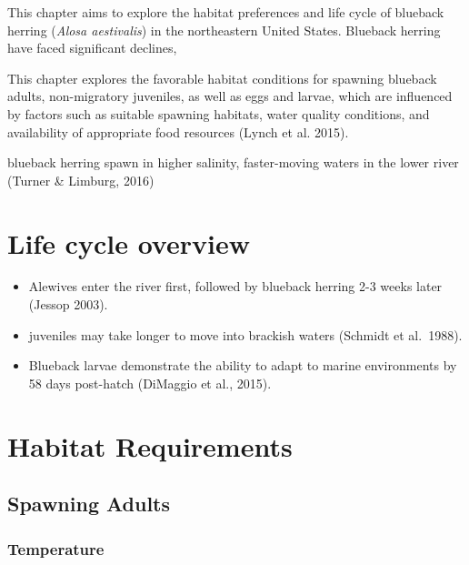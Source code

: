 \documentclass[
]{book}
\providecommand{\tightlist}{%
  \setlength{\itemsep}{0pt}\setlength{\parskip}{0pt}}
\begin{document}
This chapter aims to explore the habitat preferences and life cycle of blueback herring (\emph{Alosa aestivalis}) in the northeastern United States.
Blueback herring have faced significant declines,

This chapter explores the favorable habitat conditions for spawning blueback adults, non-migratory juveniles, as well as eggs and larvae, which are influenced by factors such as suitable spawning habitats, water quality conditions, and availability of appropriate food resources (Lynch et al. 2015).

blueback herring spawn in higher salinity, faster-moving waters in the lower river (Turner \& Limburg, 2016)

\hypertarget{life-cycle-overview-1}{%
\section{Life cycle overview}\label{life-cycle-overview-1}}

\begin{itemize}
\tightlist
\item
  Alewives enter the river first, followed by blueback herring 2-3 weeks later (Jessop 2003).
\item
  juveniles may take longer to move into brackish waters (Schmidt et al.~1988).
\item
  Blueback larvae demonstrate the ability to adapt to marine environments by 58 days post-hatch (DiMaggio et al., 2015).
\end{itemize}

\hypertarget{habitat-requirements-1}{%
\section{Habitat Requirements}\label{habitat-requirements-1}}

\hypertarget{spawning-adults}{%
\subsection{Spawning Adults}\label{spawning-adults}}

\hypertarget{temperature-3}{%
\subsubsection{Temperature}\label{temperature-3}}
\end{document}
